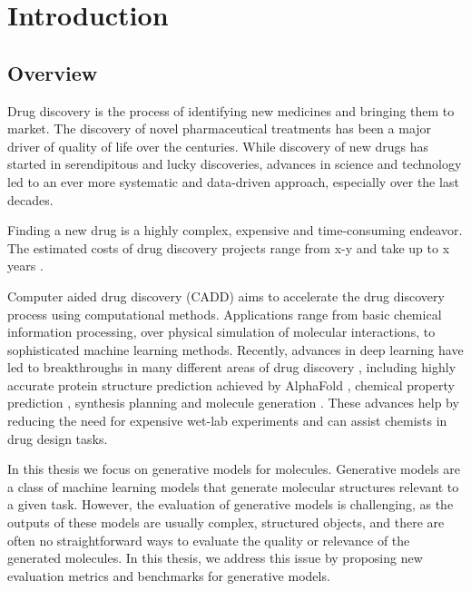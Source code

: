 \chapter{Introduction\label{chap:introduction}}
\section{Overview}
Drug discovery is the process of identifying new medicines and bringing them to
market. The discovery of novel pharmaceutical treatments has been a major driver
of quality of life over the centuries. While discovery of new drugs has started 
in serendipitous and lucky discoveries, advances in science and technology  
led to an ever more systematic and data-driven approach, especially over the
last decades. 

Finding a new drug is a highly complex, expensive and time-consuming endeavor. 
The estimated costs of drug discovery projects range from x-y \citep{todo} 
and take up to x years \citep{todo}. 

Computer aided drug discovery (CADD) aims to accelerate the drug discovery
process using computational methods. Applications range from basic chemical
information processing, over physical simulation of molecular interactions, to
sophisticated machine learning methods. Recently, advances in deep learning
have led to breakthroughs in many different
areas of drug discovery \citep{chenRiseDeepLearning2018}, including highly accurate protein structure prediction 
achieved by AlphaFold \citep{todo}, chemical property prediction
\citep{mayrDeepToxToxicityPrediction2016,todo}, synthesis planning
\citep{seglerNeuralSymbolicMachineLearning2017} and molecule generation
\citep{todo}. These advances help by reducing the need for expensive 
wet-lab experiments and can assist chemists in drug design tasks. 

In this thesis we focus on generative models for molecules. Generative models
are a class of machine learning models that generate molecular structures
relevant to a given task. However, the evaluation of generative models is
challenging, as the outputs of these models are usually complex, structured
objects, and there are often no straightforward ways to evaluate the quality or
relevance of the generated molecules. In this thesis, we address this issue by
proposing new evaluation metrics and benchmarks for generative models.

